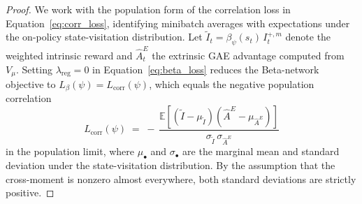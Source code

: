 \begin{proof}
We work with the population form of the correlation loss in Equation~\eqref{eq:corr_loss}, identifying minibatch averages with expectations under the on-policy state-visitation distribution. Let $\tilde I_t = \beta_\psi(s_t)\, I_t^{+,m}$ denote the weighted intrinsic reward and $\hat A_t^{E}$ the extrinsic GAE advantage computed from $V_\mu$. Setting $\lambda_\text{reg} = 0$ in Equation~\eqref{eq:beta_loss} reduces the Beta-network objective to $L_\beta(\psi) = L_\text{corr}(\psi)$, which equals the negative population correlation
\begin{equation*}
L_\text{corr}(\psi) \;=\; -\,\frac{\mathbb{E}[(\tilde I - \mu_{\tilde I})(\hat A^{E} - \mu_{\hat A^{E}})]}{\sigma_{\tilde I}\, \sigma_{\hat A^{E}}}
\end{equation*}
in the population limit, where $\mu_\bullet$ and $\sigma_\bullet$ are the marginal mean and standard deviation under the state-visitation distribution. By the assumption that the cross-moment is nonzero almost everywhere, both standard deviations are strictly positive.


\end{proof}
